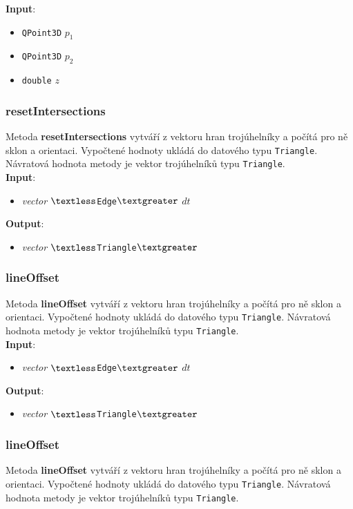 \documentclass[a4paper, 12pt]{article}
\begin{document}
\textbf{Input}:
\begin{itemize}
\item \texttt{QPoint3D} $p_1$ 
\item \texttt{QPoint3D} $p_2$ 
\item \texttt{double} $z$ 
\end{itemize}

\subsubsection*{resetIntersections}
Metoda \textbf{resetIntersections} vytváří z vektoru hran trojúhelníky a počítá pro ně sklon a orientaci. Vypočtené hodnoty ukládá do datového typu \texttt{Triangle}. Návratová hodnota metody je vektor trojúhelníků typu \texttt{Triangle}.\\

\textbf{Input}:
\begin{itemize}
\item \textsl{vector} $\textless$\texttt{Edge}$\textgreater$ $dt$
\end{itemize}

\textbf{Output}:
\begin{itemize}
\item \textsl{vector} $\textless$\texttt{Triangle}$\textgreater$
\end{itemize}

\subsubsection*{lineOffset}
Metoda \textbf{lineOffset} vytváří z vektoru hran trojúhelníky a počítá pro ně sklon a orientaci. Vypočtené hodnoty ukládá do datového typu \texttt{Triangle}. Návratová hodnota metody je vektor trojúhelníků typu \texttt{Triangle}.\\

\textbf{Input}:
\begin{itemize}
\item \textsl{vector} $\textless$\texttt{Edge}$\textgreater$ $dt$
\end{itemize}

\textbf{Output}:
\begin{itemize}
\item \textsl{vector} $\textless$\texttt{Triangle}$\textgreater$
\end{itemize}

\subsubsection*{lineOffset}
Metoda \textbf{lineOffset} vytváří z vektoru hran trojúhelníky a počítá pro ně sklon a orientaci. Vypočtené hodnoty ukládá do datového typu \texttt{Triangle}. Návratová hodnota metody je vektor trojúhelníků typu \texttt{Triangle}.\\
\end{document}
